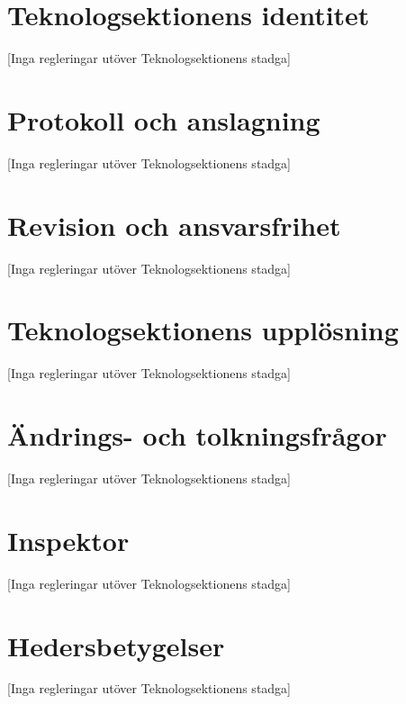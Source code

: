 \documentclass[a4paper]{dtek}
\begin{document}
\section{Teknologsektionens identitet}
\begin{center}
  [Inga regleringar utöver Teknologsektionens stadga]
\end{center}
\section{Protokoll och anslagning}
\begin{center}
  [Inga regleringar utöver Teknologsektionens stadga]
\end{center}
\section{Revision och ansvarsfrihet}
\begin{center}
  [Inga regleringar utöver Teknologsektionens stadga]
\end{center}
\section{Teknologsektionens upplösning}
\begin{center}
  [Inga regleringar utöver Teknologsektionens stadga]
\end{center}
\section{Ändrings- och tolkningsfrågor}
\begin{center}
  [Inga regleringar utöver Teknologsektionens stadga]
\end{center}
\section{Inspektor}
\begin{center}
  [Inga regleringar utöver Teknologsektionens stadga]
\end{center}
\section{Hedersbetygelser}
\begin{center}
  [Inga regleringar utöver Teknologsektionens stadga]
\end{center}
\end{document}
